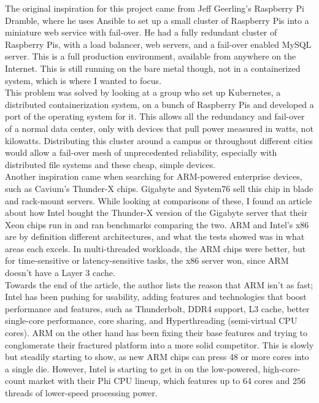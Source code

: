 \documentclass[12pt]{spieman}  %
\begin{document}
The original inspiration for this project came from Jeff Geerling's Raspberry Pi Dramble\cite{geerlingdramble}, where he uses Ansible to set up a small cluster of Raspberry Pis into a miniature web service with fail-over. He had a fully redundant cluster of Raspberry Pis, with a load balancer, web servers, and a fail-over enabled MySQL server. This is a full production environment, available from anywhere on the Internet. This is still running on the bare metal though, not in a containerized system, which is where I wanted to focus.\\

This problem was solved by looking at a group\cite{hypriotkubernetes} who set up Kubernetes, a distributed containerization system, on a bunch of Raspberry Pis and developed a port of the operating system for it. This allows all the redundancy and fail-over of a normal data center, only with devices that pull power measured in watts, not kilowatts. Distributing this cluster around a campus or throughout different cities would allow a fail-over mesh of unprecedented reliability, especially with distributed file systems and these cheap, simple devices.\\

Another inspiration came when searching for ARM-powered enterprise devices, such as Cavium's Thunder-X chips. Gigabyte and System76 sell this chip in blade and rack-mount servers. While looking at comparisons of these, I found an article about how Intel bought the Thunder-X version of the Gigabyte server that their Xeon chips run in and ran benchmarks comparing the two\cite{morganarmxeon}. ARM and Intel's x86 are by definition different architectures, and what the tests showed was in what areas each excels. In multi-threaded workloads, the ARM chips were better, but for time-sensitive or latency-sensitive tasks, the x86 server won, since ARM doesn't have a Layer 3 cache.\\

Towards the end of the article, the author lists the reason that ARM isn't as fast; Intel has been pushing for usability, adding features and technologies that boost performance and features, such as Thunderbolt, DDR4 support, L3 cache, better single-core performance, core sharing, and Hyperthreading (semi-virtual CPU cores). ARM on the other hand has been fixing their base features and trying to conglomerate their fractured platform into a more solid competitor. This is slowly but steadily starting to show, as new ARM chips can press 48 or more cores into a single die. However, Intel is starting to get in on the low-powered, high-core-count market with their Phi CPU lineup, which features up to 64 cores and 256 threads of lower-speed processing power\cite{linus64xeon}.\\
\end{document}

